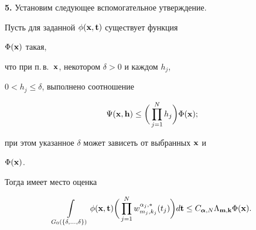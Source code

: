 \addtocounter{section}{1}


\setcounter{equation}{0}


\setcounter{lems}{0}


\setcounter{thms}{0}








{\bf 5.} Установим следующее вспомогательное утверждение.








\begin{lems}


Пусть для заданной $\phi ({\bold x},{\bold t})$ существует функция


$\Phi ({\bold x})$ такая,


что при п.\,в.~${\bold x}$, некотором $\delta >0$ и каждом $h_j$,


$0<h_j\le\delta$, выполнено соотношение


\begin{equation}


\Psi ({\bold x},{\bold h})\le\bigg(\prod_{j=1}^N h_j\bigg)\Phi ({\bold x});


\end{equation}


при этом указанное $\delta $ может зависеть от выбранных ${\bold x}$ и


$\Phi ({\bold x})$.


Тогда имеет место оценка


\begin{equation}


\int\limits_{G_0(\{\delta,\dotsc,\delta\})}


\phi ({\bold x},{\bold t})\bigg(\prod_{j=1}^N w_{m_j,k_j}^{\alpha_j,*}(t_j)


\bigg)d{\bold t}


\le C_{{\boldsymbol{\alpha}},N}\Lambda_{{\bold m},{\bold k}}\Phi ({\bold x}).


\end{equation}


\end{lems}








